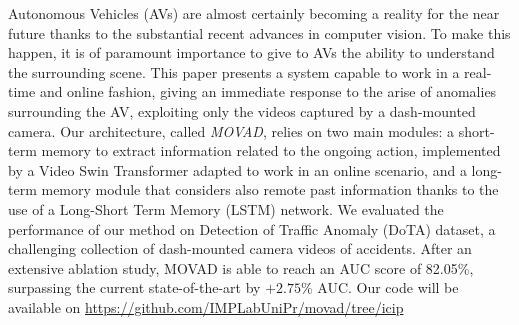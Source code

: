 Autonomous Vehicles (AVs) are almost certainly becoming a reality for the near future thanks to the substantial recent advances in computer vision.
To make this happen, it is of paramount importance to give to AVs the ability to understand the surrounding scene.
This paper presents a system capable to work in a real-time and online fashion, giving an immediate response to the arise of anomalies surrounding the AV, exploiting only the videos captured by a dash-mounted camera.
Our architecture, called \emph{MOVAD}, relies on two main modules: a short-term memory to extract information related to the ongoing action, implemented by a Video Swin Transformer adapted to work in an online scenario, and a long-term memory module that considers also remote past information thanks to the use of a Long-Short Term Memory (LSTM) network.
We evaluated the performance of our method on Detection of Traffic Anomaly (DoTA) dataset, a challenging collection of dash-mounted camera videos of accidents.
After an extensive ablation study, MOVAD is able to reach an AUC score of 82.05\%, surpassing the current state-of-the-art by $+2.75\%$ AUC.
Our code will be available on \url{https://github.com/IMPLabUniPr/movad/tree/icip}